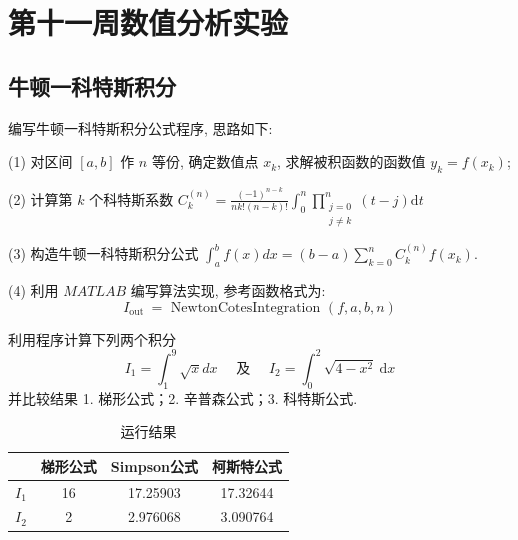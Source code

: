 \section{第十一周数值分析实验}
\subsection{牛顿一科特斯积分}
\begin{ex}
	编写牛顿一科特斯积分公式程序, 思路如下:
	
	(1) 对区间 $[a, b]$ 作 $n$ 等份, 确定数值点 $x_k$, 求解被积函数的函数值 $y_k=f\left(x_k\right)$;
	
	(2) 计算第 $k$ 个科特斯系数 $C_k^{(n)}=\frac{(-1)^{n-k}}{n k !(n-k) !} \int_0^n \prod_{\substack{j=0 \\ j \neq k}}^n(t-j) \mathrm{d} t$
	
	(3) 构造牛顿一科特斯积分公式 $\int_a^b f(x) d x=(b-a) \sum_{k=0}^n C_k^{(n)} f\left(x_k\right)$.
	
	(4) 利用 $M A T L A B$ 编写算法实现, 参考函数格式为:
	$$
	I_{\text {out }}=\text { NewtonCotesIntegration }(f, a, b, n)
	$$
\end{ex}

\begin{ex}
	利用程序计算下列两个积分
	$$
	I_1=\int_1^9 \sqrt{x} d x \quad \text { 及 } \quad I_2=\int_0^2 \sqrt{4-x^2} \mathrm{~d} x
	$$
	并比较结果
	1. 梯形公式；2. 辛普森公式；3. 科特斯公式.
\end{ex}

\qa 
\begin{table}[htbp]
	\centering
	\caption{运行结果}
	\begin{tabular}{l|ccc}
		& \multicolumn{1}{l}{梯形公式} & \multicolumn{1}{l}{Simpson公式} & \multicolumn{1}{l}{柯斯特公式} \\
		\hline
		$I_1$   & 16    & 17.25903 & 17.32644 \\
		$I_2$   & 2     & 2.976068 & 3.090764 \\
	\end{tabular}%
	\label{tab:addlabel11}%
\end{table}%

